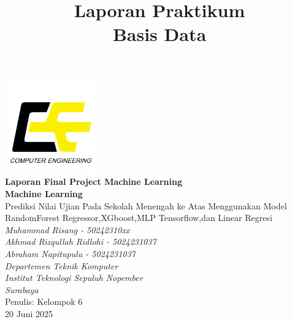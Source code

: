 \documentclass[a4paper,12pt]{report}
\title{Laporan Praktikum\\
Basis Data}
\author{}
\date{}
\begin{document}
\begin{titlepage}
    \centering

    \includegraphics[width=0.3\textwidth]{images/logo-tekkom.png}\\[1cm]

    {\Huge \textbf{Laporan Final Project Machine Learning}\\[0.3cm]}
    {\Huge \textbf{Machine Learning}}\\[1cm]
    
    {\Large \textbf{}{Prediksi Nilai Ujian Pada Sekolah Menengah ke Atas Menggunakan Model RandomForest 
    Regressor,XGboost,MLP Tensorflow,dan Linear Regresi}}\\[0.3cm]
    {\Large \textit{Muhammad Risang - 50242310xx}}\\[0.3cm]
    {\Large \textit{Akhmad Rizqullah Ridlohi - 5024231037}}\\[0.3cm]
    {\Large \textit{Abraham Napitupulu - 5024231037}}\\[0.3cm]

    
    {\large \textit{Departemen Teknik Komputer}}\\
    {\large \textit{Institut Teknologi Sepuluh Nopember}}\\
    {\large \textit{Surabaya}}\\[3cm]

    \hfill Penulis: Kelompok 6\\
    \hfill 20 Juni 2025
\end{titlepage}

\tableofcontents
\clearpage











\end{document}
